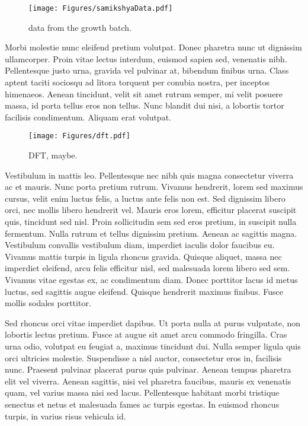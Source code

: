     \begin{figure}
        \centering
        \texttt{[image: Figures/samikshyaData.pdf]}
        \caption{data from the growth batch. }
        \label{fig:topoIns}
    \end{figure}

Morbi molestie nunc eleifend pretium volutpat. Donec pharetra nunc ut dignissim ullamcorper. Proin vitae lectus interdum, euismod sapien sed, venenatis nibh. Pellentesque justo urna, gravida vel pulvinar at, bibendum finibus urna. Class aptent taciti sociosqu ad litora torquent per conubia nostra, per inceptos himenaeos. Aenean tincidunt, velit sit amet rutrum semper, mi velit posuere massa, id porta tellus eros non tellus. Nunc blandit dui nisi, a lobortis tortor facilisis condimentum. Aliquam erat volutpat.

    \begin{figure}
        \centering
        \texttt{[image: Figures/dft.pdf]}
        \caption{DFT, maybe. }
        \label{fig:topoIns}
    \end{figure}

Vestibulum in mattis leo. Pellentesque nec nibh quis magna consectetur viverra ac et mauris. Nunc porta pretium rutrum. Vivamus hendrerit, lorem sed maximus cursus, velit enim luctus felis, a luctus ante felis non est. Sed dignissim libero orci, nec mollis libero hendrerit vel. Mauris eros lorem, efficitur placerat suscipit quis, tincidunt sed nisl. Proin sollicitudin sem sed eros pretium, in suscipit nulla fermentum. Nulla rutrum et tellus dignissim pretium. Aenean ac sagittis magna. Vestibulum convallis vestibulum diam, imperdiet iaculis dolor faucibus eu. Vivamus mattis turpis in ligula rhoncus gravida. Quisque aliquet, massa nec imperdiet eleifend, arcu felis efficitur nisl, sed malesuada lorem libero sed sem. Vivamus vitae egestas ex, ac condimentum diam. Donec porttitor lacus id metus luctus, sed sagittis augue eleifend. Quisque hendrerit maximus finibus. Fusce mollis sodales porttitor.

Sed rhoncus orci vitae imperdiet dapibus. Ut porta nulla at purus vulputate, non lobortis lectus pretium. Fusce at augue sit amet arcu commodo fringilla. Cras urna odio, volutpat eu feugiat a, maximus tincidunt dui. Nulla semper ligula quis orci ultricies molestie. Suspendisse a nisl auctor, consectetur eros in, facilisis nunc. Praesent pulvinar placerat purus quis pulvinar. Aenean tempus pharetra elit vel viverra. Aenean sagittis, nisi vel pharetra faucibus, mauris ex venenatis quam, vel varius massa nisi sed lacus. Pellentesque habitant morbi tristique senectus et netus et malesuada fames ac turpis egestas. In euismod rhoncus turpis, in varius risus vehicula id.

